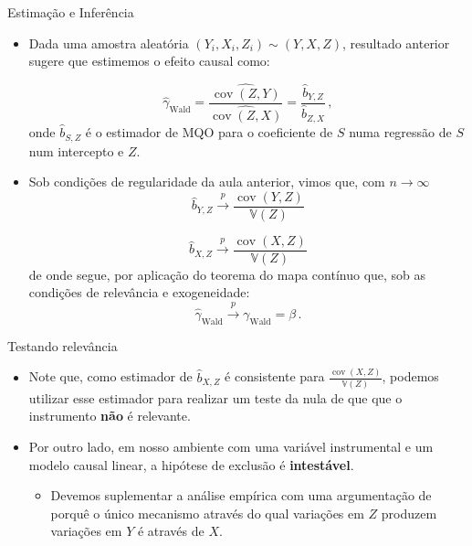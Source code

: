 \documentclass[11pt]{beamer}
\begin{document}
\begin{frame}{Estimação e Inferência}
	\begin{itemize}
		\item Dada uma amostra aleatória $(Y_i,X_i,Z_i)\sim (Y,X,Z)$, resultado anterior sugere que estimemos o efeito causal como:
		
		$$\hat{\gamma}_{\text{Wald}} = \frac{\widehat{\operatorname{cov}(Z,Y)}}{\widehat{\operatorname{cov}(Z,X)}} = \frac{\hat{b}_{Y,Z}}{\hat{b}_{Z,X}}\, ,$$
		onde $\hat{b}_{S,Z}$ é o estimador de MQO para o coeficiente de $S$ numa regressão de $S$ num intercepto e $Z$.
		\item Sob condições de regularidade da aula anterior, vimos que, com $n \to \infty$ $$\hat{b}_{Y,Z} \overset{p}{\to} \frac{\operatorname{cov}(Y,Z)}{\mathbb{V}(Z)}$$
		
		$$\hat{b}_{X,Z} \overset{p}{\to} \frac{\operatorname{cov}(X,Z)}{\mathbb{V}(Z)}$$
		de onde segue, por aplicação do teorema do mapa contínuo que, sob as condições de relevância e exogeneidade:
		\vspace{-0.2em}
		$$\hat{\gamma}_{\text{Wald}}  \overset{p}{\to} \gamma_{\text{Wald}} = \beta\, .$$
		
	\end{itemize}
\end{frame}
\begin{frame}{Testando relevância}
	\begin{itemize}
		\item Note que, como estimador de $\hat{b}_{X,Z}$ é consistente para $\frac{\operatorname{cov}(X,Z)}{\mathbb{V}(Z)}$, podemos utilizar esse estimador para realizar um teste da nula de que que o {instrumento} \textbf{não} é relevante.
		\item Por outro lado, em nosso ambiente com uma variável instrumental e um modelo causal linear, a hipótese de {exclusão} é \textbf{intestável}.
		\begin{itemize}
			\item Devemos suplementar a análise empírica com uma argumentação de porquê o único mecanismo através do qual variações em $Z$ produzem variações em $Y$ é através de $X$.
		\end{itemize}
	\end{itemize}
\end{frame}
\end{document}
